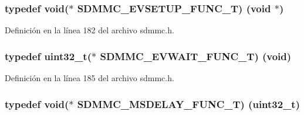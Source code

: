 \subsubsection[{\texorpdfstring{S\+D\+M\+M\+C\+\_\+\+E\+V\+S\+E\+T\+U\+P\+\_\+\+F\+U\+N\+C\+\_\+T}{SDMMC_EVSETUP_FUNC_T}}]{\setlength{\rightskip}{0pt plus 5cm}typedef void($\ast$ S\+D\+M\+M\+C\+\_\+\+E\+V\+S\+E\+T\+U\+P\+\_\+\+F\+U\+N\+C\+\_\+T) (void $\ast$)}\hypertarget{group___c_h_i_p___s_d_m_m_c___definitions_gad8f6b6485a8de8a55a8cdee88788a64c}{}\label{group___c_h_i_p___s_d_m_m_c___definitions_gad8f6b6485a8de8a55a8cdee88788a64c}


Definición en la línea 182 del archivo sdmmc.\+h.

\subsubsection[{\texorpdfstring{S\+D\+M\+M\+C\+\_\+\+E\+V\+W\+A\+I\+T\+\_\+\+F\+U\+N\+C\+\_\+T}{SDMMC_EVWAIT_FUNC_T}}]{\setlength{\rightskip}{0pt plus 5cm}typedef uint32\+\_\+t($\ast$ S\+D\+M\+M\+C\+\_\+\+E\+V\+W\+A\+I\+T\+\_\+\+F\+U\+N\+C\+\_\+T) (void)}\hypertarget{group___c_h_i_p___s_d_m_m_c___definitions_ga3379c3596d02e20e0531dc1287df505f}{}\label{group___c_h_i_p___s_d_m_m_c___definitions_ga3379c3596d02e20e0531dc1287df505f}


Definición en la línea 185 del archivo sdmmc.\+h.

\subsubsection[{\texorpdfstring{S\+D\+M\+M\+C\+\_\+\+M\+S\+D\+E\+L\+A\+Y\+\_\+\+F\+U\+N\+C\+\_\+T}{SDMMC_MSDELAY_FUNC_T}}]{\setlength{\rightskip}{0pt plus 5cm}typedef void($\ast$ S\+D\+M\+M\+C\+\_\+\+M\+S\+D\+E\+L\+A\+Y\+\_\+\+F\+U\+N\+C\+\_\+T) (uint32\+\_\+t)}\hypertarget{group___c_h_i_p___s_d_m_m_c___definitions_ga910711513843f370e9b251ec60b245e7}{}\label{group___c_h_i_p___s_d_m_m_c___definitions_ga910711513843f370e9b251ec60b245e7}


